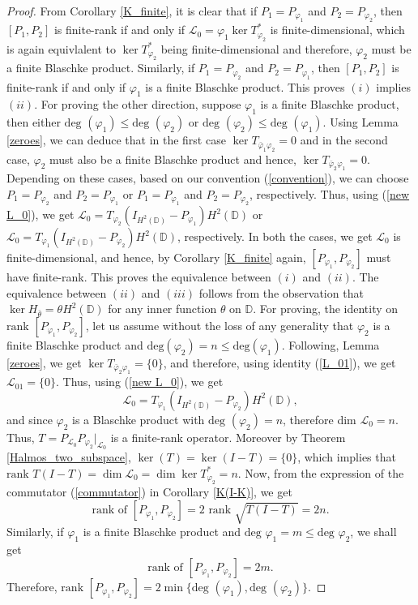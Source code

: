\documentclass[12pt, a4 paper]{amsart}
\newcommand{\cll}{\mathcal{L}}
\newcommand{\D}{\mathbb{D}}
\theoremstyle{definition}
\theoremstyle{plain}
\theoremstyle{definition}
\numberwithin{equation}{section}
\let\phi=\varphi
\begin{document}
\begin{proof}
 From Corollary \ref{K_finite}, it is clear that if $P_1 = P_{\phi_1}$ and $P_2 = P_{\phi_2}$, then $[P_1, P_2]$ is finite-rank if and only if $\cll_0 = \phi_1 \ker T_{\phi_2}^*$ is finite-dimensional, which is again equivlalent to $\ker T_{\phi_2}^*$ being finite-dimensional and therefore, $\phi_2$ must be a finite Blaschke product. Similarly, if $P_1 = P_{\phi_2}$ and $P_2 = P_{\phi_1}$, then $[P_1, P_2]$ is finite-rank if and only if $\phi_1$ is a finite Blaschke product. This proves $(i)$ implies $(ii)$. For proving the other direction, suppose $\phi_1$ is a finite Blaschke product, then either $\mbox{deg }(\phi_1) \leq  \mbox{deg }(\phi_2)$ or $\mbox{deg }(\phi_2) \leq  \mbox{deg }(\phi_1)$. Using Lemma \ref{zeroes}, we can deduce that in the first case $\ker T_{\bar \phi_1 \phi_2}=0$ and in the second case, $\phi_2$ must also be a finite Blaschke product and hence, $\ker T_{\bar \phi_2 \phi_1}=0$. Depending on these cases, based on our convention (\ref{convention}), we can choose $P_1 = P_{\phi_2}$ and $P_2 = P_{\phi_1}$ or $P_1 = P_{\phi_1}$ and $P_2 = P_{\phi_2}$, respectively. Thus, using  (\ref{new L_0}), we get
$
\cll_0=T_{\phi_2}(I_{H^2(\D)}-P_{\phi_1})H^2(\D)
$ or $
\cll_0=T_{\phi_1}(I_{H^2(\D)}-P_{\phi_2})H^2(\D)
$, respectively. In both the cases, we get $\cll_0$ is finite-dimensional, and hence, by Corollary \ref{K_finite} again, $[P_{\phi_1}, P_{\phi_2}]$ must have finite-rank. This proves the equivalence between $(i)$ and $(ii)$. The equivalence between $(ii)$ and $(iii)$ follows from the observation that $\ker H_{\bar \theta} = \theta H^2(\D)$ for any inner function $\theta$ on $\D$.  For proving, the identity on $\mbox{rank }[P_{\phi_1}, P_{\phi_2}]$, let us assume without the loss of any generality that $\phi_2$ is a finite Blaschke product and $\text{deg}(\phi_2)=n\leq \text{deg}(\phi_1)$. Following, Lemma \ref{zeroes}, we get $\ker T_{\bar\phi_2\phi_1} =\{0\}$, and therefore, using identity  (\ref{L_01}), we get $\cll_{01} = \{0\}$. Thus, using  (\ref{new L_0}), we get
\[
\cll_0=T_{\phi_1}(I_{H^2(\D)}-P_{\phi_2})H^2(\D),
\]
and since $\phi_2$ is a Blaschke product with $\mbox{deg }(\phi_2)=n$, therefore dim $\cll_0=n$. Thus, $T=P_{\cll_0}P_{\phi_2}|_{\cll_0}$ is a finite-rank operator. Moreover by Theorem \ref{Halmos_two_subspace}, $\ker (T)=\ker (I-T)=\{0\}$, which implies that $\mbox{rank }T(I - T) = \dim \cll_0 = \dim \ker T_{\phi_2}^* = n$.  Now, from the expression of the commutator (\ref{commutator}) in Corollary \ref{K(I-K)}, we get 
\[
\text{rank of } [P_{\phi_1}, P_{\phi_2}] = 2 \mbox{ rank }\sqrt{T(I-  T)} = 2n.
\]
Similarly, if $\phi_1$ is a finite Blaschke product and $\mbox{deg } \phi_1 = m \leq \mbox{deg } \phi_2 $, we shall get
\[
\text{rank of } [P_{\phi_1}, P_{\phi_2}] =  2m.
\]
Therefore, $\mbox{rank } [P_{\phi_1}, P_{\phi_2}] =  2 \min\{ \mbox{deg } (\phi_1), \mbox{deg } (\phi_2)\}$. 
\end{proof}
\end{document}
